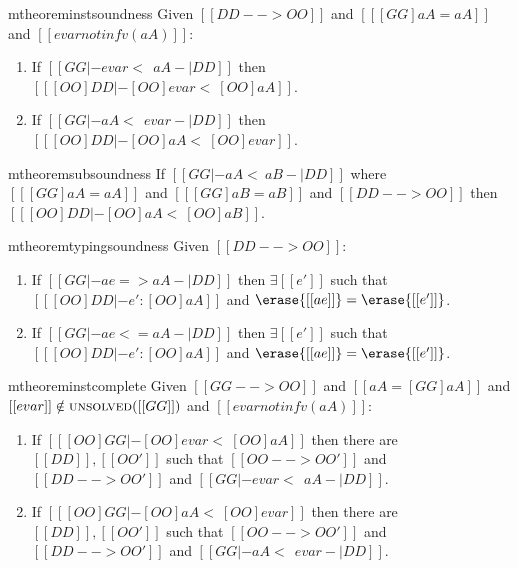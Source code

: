 \begin{restatable}{mtheorem}{instsoundness} \label{thm:inst_soundness}%
  Given $[[ DD --> OO ]]$ and $[[ [GG]aA = aA ]]$ and  $[[evar notin fv(aA)]]$:

  \begin{enumerate}
  \item If $[[GG |- evar <~~  aA -| DD ]]$ then $[[  [OO]DD |- [OO]evar <~ [OO]aA  ]] $.
  \item If $[[GG |- aA <~~ evar -| DD ]]$ then $[[  [OO]DD |- [OO]aA <~ [OO]evar  ]] $.
  \end{enumerate}
\end{restatable}


\begin{restatable}{mtheorem}{subsoundness} \label{thm:sub_soundness}%
  If $[[  GG |- aA <~ aB -| DD ]]$ where $[[ [GG]aA = aA  ]]$ and $[[  [GG] aB = aB  ]]$ and $[[  DD --> OO ]]$ then
  $[[  [OO]DD |- [OO]aA <~ [OO]aB   ]]$.
\end{restatable}



\begin{restatable}{mtheorem}{typingsoundness} \label{thm:type_sound}%
  Given $[[DD --> OO]]$:
  \begin{enumerate}
  \item If $[[  GG |- ae => aA -| DD  ]]$ then $\exists [[e']]$ such that $ [[  [OO]DD |- e' : [OO] aA  ]]   $ and $\erase{[[ae]]} = \erase{[[e']]}$.
  \item If $[[  GG |- ae <= aA -| DD  ]]$ then $\exists [[e']]$ such that $ [[  [OO]DD |- e' : [OO] aA  ]]   $ and $\erase{[[ae]]} = \erase{[[e']]}$.
  \end{enumerate}
\end{restatable}

\begin{restatable}{mtheorem}{instcomplete} \label{thm:inst_complete}
  Given $[[GG --> OO]]$ and $[[aA = [GG]aA]]$ and $[[evar]] \notin \textsc{unsolved}([[GG]]) $ and $[[  evar notin fv(aA)  ]]$:
  \begin{enumerate}
  \item If $[[ [OO]GG |- [OO] evar <~ [OO]aA   ]]$ then there are $[[DD]], [[OO']]$ such that $[[OO --> OO']]$
    and $[[DD --> OO']]$ and $[[GG |- evar <~~ aA -| DD]]$.
  \item If $[[ [OO]GG |- [OO]aA  <~ [OO] evar  ]]$ then there are $[[DD]], [[OO']]$ such that $[[OO --> OO']]$
    and $[[DD --> OO']]$ and $[[GG |- aA <~~ evar -| DD]]$.
  \end{enumerate}

\end{restatable}


